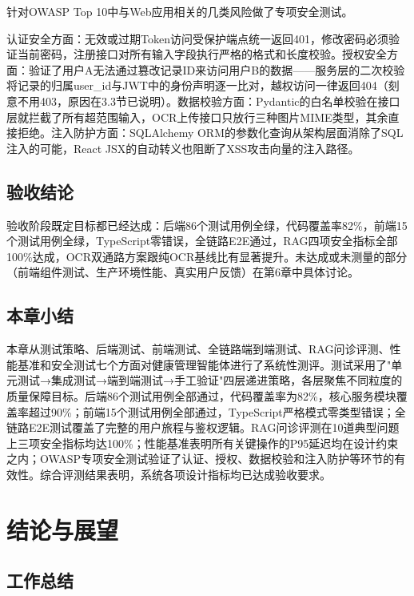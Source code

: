 \documentclass[zihao=-4,a4paper]{ctexart}
\begin{document}
针对OWASP Top 10中与Web应用相关的几类风险做了专项安全测试。

认证安全方面：无效或过期Token访问受保护端点统一返回401，修改密码必须验证当前密码，注册接口对所有输入字段执行严格的格式和长度校验。授权安全方面：验证了用户A无法通过篡改记录ID来访问用户B的数据——服务层的二次校验将记录的归属user\_id与JWT中的身份声明逐一比对，越权访问一律返回404（刻意不用403，原因在3.3节已说明）。数据校验方面：Pydantic的白名单校验在接口层就拦截了所有超范围输入，OCR上传接口只放行三种图片MIME类型，其余直接拒绝。注入防护方面：SQLAlchemy ORM的参数化查询从架构层面消除了SQL注入的可能，React JSX的自动转义也阻断了XSS攻击向量的注入路径。

\subsection{验收结论}

验收阶段既定目标都已经达成：后端86个测试用例全绿，代码覆盖率82\%，前端15个测试用例全绿，TypeScript零错误，全链路E2E通过，RAG四项安全指标全部100\%达成，OCR双通路方案跟纯OCR基线比有显著提升。未达成或未测量的部分（前端组件测试、生产环境性能、真实用户反馈）在第6章中具体讨论。

\subsection{本章小结}

本章从测试策略、后端测试、前端测试、全链路端到端测试、RAG问诊评测、性能基准和安全测试七个方面对健康管理智能体进行了系统性测评。测试采用了"单元测试→集成测试→端到端测试→手工验证"四层递进策略，各层聚焦不同粒度的质量保障目标。后端86个测试用例全部通过，代码覆盖率为82\%，核心服务模块覆盖率超过90\%；前端15个测试用例全部通过，TypeScript严格模式零类型错误；全链路E2E测试覆盖了完整的用户旅程与鉴权逻辑。RAG问诊评测在10道典型问题上三项安全指标均达100\%；性能基准表明所有关键操作的P95延迟均在设计约束之内；OWASP专项安全测试验证了认证、授权、数据校验和注入防护等环节的有效性。综合评测结果表明，系统各项设计指标均已达成验收要求。

\newpage
\section{结论与展望}

\subsection{工作总结}
\end{document}
